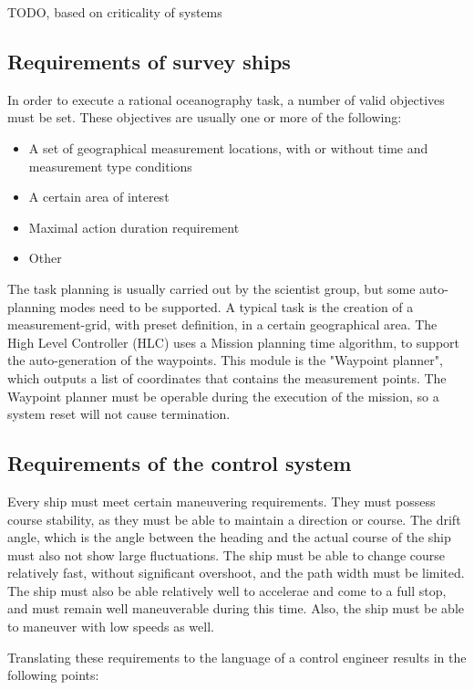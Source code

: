TODO, based on criticality of systems

\subsection{Requirements of survey ships}

In order to execute a rational oceanography task, a number of valid objectives must be set. These objectives are usually one or more of the following\cite{oceanography}:

\begin{itemize}
\item A set of geographical measurement locations, with or without time and measurement type conditions
\item A certain area of interest
\item Maximal action duration requirement
\item Other
\end{itemize}

The task planning is usually carried out by the scientist group, but some auto-planning modes need to be supported. A typical task is the creation of a measurement-grid, with preset definition, in a certain geographical area. The High Level Controller (HLC) uses a Mission planning time algorithm, to support the auto-generation of the waypoints. This module is the "Waypoint planner", which outputs a list of coordinates that contains the measurement points. The Waypoint planner must be operable during the execution of the mission, so a system reset will not cause termination.

\subsection{Requirements of the control system}

Every ship must meet certain maneuvering requirements\cite[p. 53]{hydromechanics}. They must possess course stability, as they must be able to maintain a direction or course. The drift angle, which is the angle between the heading and the actual course of the ship must also not show large fluctuations. The ship must be able to change course relatively fast, without significant overshoot, and the path width must be limited. The ship must also be able relatively well to accelerae and come to a full stop, and must remain well maneuverable during this time. Also, the ship must be able to maneuver with low speeds as well.

Translating these requirements to the language of a control engineer results in the following points:

